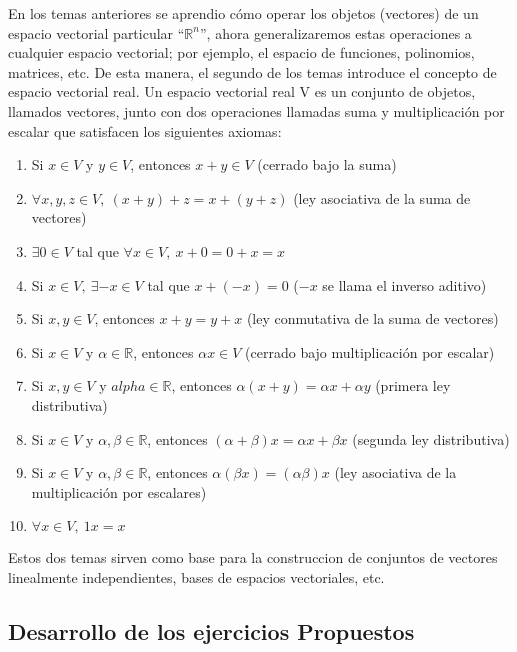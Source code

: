 \documentclass[
]{article}
\begin{document}
En los temas anteriores se aprendio cómo operar los objetos (vectores)
de un espacio vectorial particular ``\(\mathbb{R}^{n}\)'', ahora
generalizaremos estas operaciones a cualquier espacio vectorial; por
ejemplo, el espacio de funciones, polinomios, matrices, etc. De esta
manera, el segundo de los temas introduce el concepto de espacio
vectorial real. Un espacio vectorial real V es un conjunto de objetos,
llamados vectores, junto con dos operaciones llamadas suma y
multiplicación por escalar que satisfacen los siguientes axiomas:

\begin{enumerate}
\def\labelenumi{\arabic{enumi}.}
\item
  Si \(x \in V\) y \(y \in V\), entonces \(x + y \in V\) (cerrado bajo
  la suma)
\item
  \(\forall x,y,z \in V,\ (x + y) + z = x + (y + z)\) (ley asociativa de
  la suma de vectores)
\item
  \(\exists 0 \in V\) tal que \(\forall x \in V,\ x + 0 = 0 + x = x\)
\item
  Si \(x \in V,\ \exists - x \in V\) tal que \(x + ( - x) = 0\) (\(- x\)
  se llama el inverso aditivo)
\item
  Si \(x,y \in V\), entonces \(x + y = y + x\) (ley conmutativa de la
  suma de vectores)
\item
  Si \(x \in V\) y \(\alpha \in \mathbb{R}\), entonces
  \(\alpha x \in V\) (cerrado bajo multiplicación por escalar)
\item
  Si \(x,y \in V\) y \(alpha \in \mathbb{R}\), entonces
  \(\alpha(x + y) = \alpha x + \alpha y\) (primera ley distributiva)
\item
  Si \(x \in V\) y \(\alpha,\beta \in \mathbb{R}\), entonces
  \((\alpha + \beta)x = \alpha x + \beta x\) (segunda ley distributiva)
\item
  Si \(x \in V\) y \(\alpha,\beta \in \mathbb{R}\), entonces
  \(\alpha(\beta x) = (\alpha\beta)x\) (ley asociativa de la
  multiplicación por escalares)
\item
  \(\forall x \in V,\ 1x = x\)
\end{enumerate}

Estos dos temas sirven como base para la construccion de conjuntos de
vectores linealmente independientes, bases de espacios vectoriales, etc.

\hypertarget{desarrollo-de-los-ejercicios-propuestos}{%
\subsection{Desarrollo de los ejercicios
Propuestos}\label{desarrollo-de-los-ejercicios-propuestos}}
\end{document}
